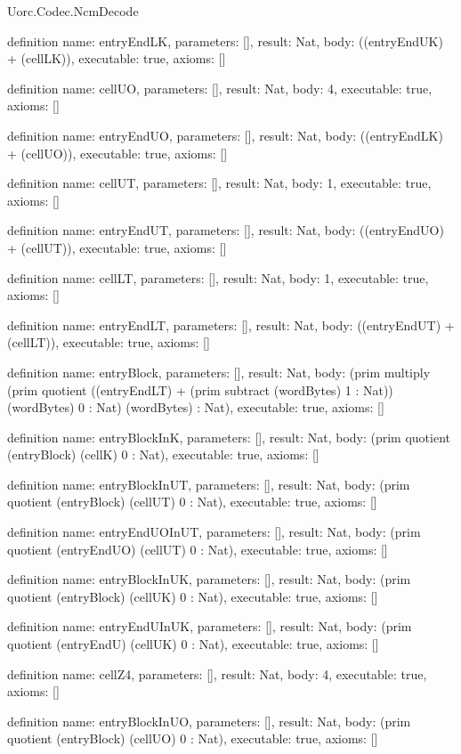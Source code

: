 \begin{lexlean}{Uorc.Codec.NcmDecode}
\begin{semanticmodule}
definition{
  name: entryEndLK,
  parameters: [],
  result: Nat,
  body: ((entryEndUK) + (cellLK)),
  executable: true,
  axioms: []
}

definition{
  name: cellUO,
  parameters: [],
  result: Nat,
  body: 4,
  executable: true,
  axioms: []
}

definition{
  name: entryEndUO,
  parameters: [],
  result: Nat,
  body: ((entryEndLK) + (cellUO)),
  executable: true,
  axioms: []
}

definition{
  name: cellUT,
  parameters: [],
  result: Nat,
  body: 1,
  executable: true,
  axioms: []
}

definition{
  name: entryEndUT,
  parameters: [],
  result: Nat,
  body: ((entryEndUO) + (cellUT)),
  executable: true,
  axioms: []
}

definition{
  name: cellLT,
  parameters: [],
  result: Nat,
  body: 1,
  executable: true,
  axioms: []
}

definition{
  name: entryEndLT,
  parameters: [],
  result: Nat,
  body: ((entryEndUT) + (cellLT)),
  executable: true,
  axioms: []
}

definition{
  name: entryBlock,
  parameters: [],
  result: Nat,
  body: (prim multiply (prim quotient ((entryEndLT) + (prim subtract (wordBytes) 1 : Nat)) (wordBytes) 0 : Nat) (wordBytes) : Nat),
  executable: true,
  axioms: []
}

definition{
  name: entryBlockInK,
  parameters: [],
  result: Nat,
  body: (prim quotient (entryBlock) (cellK) 0 : Nat),
  executable: true,
  axioms: []
}

definition{
  name: entryBlockInUT,
  parameters: [],
  result: Nat,
  body: (prim quotient (entryBlock) (cellUT) 0 : Nat),
  executable: true,
  axioms: []
}

definition{
  name: entryEndUOInUT,
  parameters: [],
  result: Nat,
  body: (prim quotient (entryEndUO) (cellUT) 0 : Nat),
  executable: true,
  axioms: []
}

definition{
  name: entryBlockInUK,
  parameters: [],
  result: Nat,
  body: (prim quotient (entryBlock) (cellUK) 0 : Nat),
  executable: true,
  axioms: []
}

definition{
  name: entryEndUInUK,
  parameters: [],
  result: Nat,
  body: (prim quotient (entryEndU) (cellUK) 0 : Nat),
  executable: true,
  axioms: []
}

definition{
  name: cellZ4,
  parameters: [],
  result: Nat,
  body: 4,
  executable: true,
  axioms: []
}

definition{
  name: entryBlockInUO,
  parameters: [],
  result: Nat,
  body: (prim quotient (entryBlock) (cellUO) 0 : Nat),
  executable: true,
  axioms: []
}


\end{semanticmodule}
\end{lexlean}
